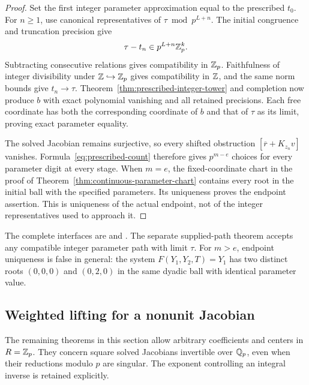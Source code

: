 \begin{proof}
Set the first integer parameter approximation equal to the prescribed
$t_0$. For $n\ge1$, use canonical representatives of
$\tau\bmod p^{L+n}$. The initial congruence and truncation precision give
\[
 \tau-t_n\in p^{L+n}\mathbb Z_p^k.
\]
Subtracting consecutive relations gives compatibility in $\mathbb Z_p$.
Faithfulness of integer divisibility under $\mathbb Z\hookrightarrow\mathbb Z_p$
gives compatibility in $\mathbb Z$, and the same norm bounds give $t_n\to\tau$.
Theorem~\ref{thm:prescribed-integer-tower} and completion now produce $b$
with exact polynomial vanishing and all retained precisions. Each free
coordinate has both the corresponding coordinate of $b$ and that of
$\tau$ as its limit, proving exact parameter equality.

The solved Jacobian remains surjective, so every shifted obstruction
$[\overline r+K_{z_n}v]$ vanishes. Formula~\eqref{eq:prescribed-count}
therefore gives $p^{m-e}$ choices for every parameter digit at every stage.
When $m=e$, the fixed-coordinate chart in the proof of
Theorem~\ref{thm:continuous-parameter-chart} contains every root in the
initial ball with the specified parameters. Its uniqueness proves the
endpoint assertion. This is uniqueness of the actual endpoint, not of the
integer representatives used to approach it.
\end{proof}

The complete interfaces are
and .
The separate supplied-path theorem
accepts any compatible integer parameter path with limit $\tau$.
For $m>e$, endpoint uniqueness is false in general: the system
$F(Y_1,Y_2,T)=Y_1$ has two distinct roots $(0,0,0)$ and $(0,2,0)$ in the
same dyadic ball with identical parameter value.

\subsection{Weighted lifting for a nonunit Jacobian}

The remaining theorems in this section allow arbitrary coefficients and
centers in $R=\mathbb Z_p$. They concern square solved Jacobians invertible over
$\mathbb Q_p$, even when their reductions modulo $p$ are singular. The exponent
controlling an integral inverse is retained explicitly.

